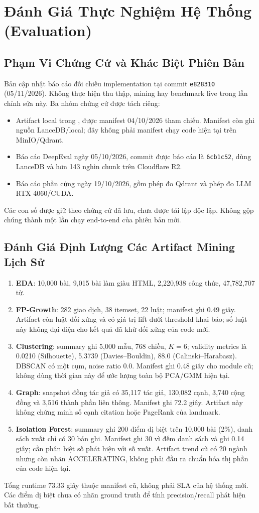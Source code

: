 \chapter{Đánh Giá Thực Nghiệm Hệ Thống (Evaluation)}
\label{chap:evaluation}
\section{Phạm Vi Chứng Cứ và Khác Biệt Phiên Bản}
Bản cập nhật báo cáo đối chiếu implementation tại commit \texttt{e828310} (05/11/2026). Không thực hiện thu thập, mining hay benchmark live trong lần chỉnh sửa này. Ba nhóm chứng cứ được tách riêng:
\begin{itemize}
\item Artifact local trong , được manifest 04/10/2026 tham chiếu. Manifest còn ghi nguồn LanceDB/local; đây không phải manifest chạy code hiện tại trên MinIO/Qdrant.
\item Báo cáo DeepEval ngày 05/10/2026, commit được báo cáo là \texttt{6cb1c52}, dùng LanceDB và hơn 143 nghìn chunk trên Cloudflare R2.
\item Báo cáo phần cứng ngày 19/10/2026, gồm phép đo Qdrant và phép đo LLM RTX 4060/CUDA.
\end{itemize}
Các con số được giữ theo chứng cứ đã lưu, chưa được tái lập độc lập. Không gộp chúng thành một lần chạy end-to-end của phiên bản mới.

\section{Đánh Giá Định Lượng Các Artifact Mining Lịch Sử}
\begin{enumerate}
\item \textbf{EDA}: 10,000 bài, 9,015 bài làm giàu HTML, 2,220,938 công thức, 47,782,707 từ.
\item \textbf{FP-Growth}: 282 giao dịch, 38 itemset, 22 luật; manifest ghi 0.49 giây. Artifact còn luật đối xứng và có giá trị lift dưới threshold khai báo; số luật này không đại diện cho kết quả đã khử đối xứng của code mới.
\item \textbf{Clustering}: summary ghi 5,000 mẫu, 768 chiều, $K=6$; validity metrics là 0.0210 (Silhouette), 5.3739 (Davies--Bouldin), 88.0 (Calinski--Harabasz). DBSCAN có một cụm, noise ratio 0.0. Manifest ghi 0.48 giây cho module cũ; không dùng thời gian này để ước lượng toàn bộ PCA/GMM hiện tại.
\item \textbf{Graph}: snapshot đồng tác giả có 35,117 tác giả, 130,082 cạnh, 3,740 cộng đồng và 3,516 thành phần liên thông. Manifest ghi 72.2 giây. Artifact này không chứng minh số cạnh citation hoặc PageRank của landmark.
\item \textbf{Isolation Forest}: summary ghi 200 điểm dị biệt trên 10,000 bài (2\%), danh sách xuất chỉ có 30 bản ghi. Manifest ghi 30 vì đếm danh sách và ghi 0.14 giây; cần phân biệt số phát hiện với số xuất. Artifact trend cũ có 20 ngành nhưng còn nhãn ACCELERATING, không phải đầu ra chuẩn hóa thị phần của code hiện tại.
\end{enumerate}
Tổng runtime 73.33 giây thuộc manifest cũ, không phải SLA của hệ thống mới. Các điểm dị biệt chưa có nhãn ground truth để tính precision/recall phát hiện bất thường.

